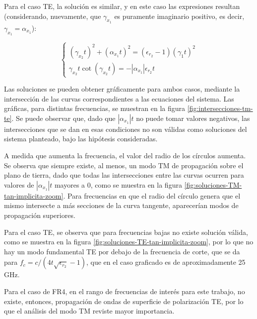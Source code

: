 Para el caso TE, la solución es similar, y en este caso las expresiones resultan (considerando, nuevamente, que $\gamma_{x_1}$ es puramente imaginario positivo, es decir, $\gamma_{x_1} = \alpha_{x_1}$):

\begin{equation}
	\label{eq:sistema-ondas-superficiales-TE}
	\begin{cases}
		(\gamma_{x_2} t)^2 + (\alpha_{x_1} t)^2 = (\epsilon_{r_2} - 1) (\gamma_1 t)^2 \\
		\gamma_{x_2} t \cot (\gamma_{x_2} t) = -|\alpha_{x_1}| \epsilon_{r_2} t
	\end{cases}
\end{equation}

Las soluciones se pueden obtener gráficamente para ambos casos, mediante la intersección de las curvas correspondientes a las ecuaciones del sistema. Las gráficas, para distintas frecuencias, se muestran en la figura \ref{fig:intersecciones-tm-te}. Se puede observar que, dado que $|\alpha_{x_1}|t$ no puede tomar valores negativos, las intersecciones que se dan en esas condiciones no son válidas como soluciones del sistema planteado, bajo las hipótesis consideradas.

A medida que aumenta la frecuencia, el valor del radio de los círculos aumenta. Se observa que siempre existe, al menos, un modo TM de propagación sobre el plano de tierra, dado que todas las intersecciones entre las curvas ocurren para valores de $|\alpha_{x_1}| t$ mayores a 0, como se muestra en la figura \ref{fig:soluciones-TM-tan-implicita-zoom}. Para frecuencias en que el radio del círculo genera que el mismo intersecte a más secciones de la curva tangente, aparecerían modos de propagación superiores.

Para el caso TE, se observa que para frecuencias bajas no existe solución válida, como se muestra en la figura \ref{fig:soluciones-TE-tan-implicita-zoom}, por lo que no hay un modo fundamental TE por debajo de la frecuencia de corte, que se da para $f_c = c/(4 t  \sqrt{\epsilon_{r_2}}-1)$, que en el caso graficado es de aproximadamente 25 GHz.

Para el caso de FR4, en el rango de frecuencias de interés para este trabajo, no existe, entonces, propagación de ondas de superficie de polarización TE, por lo que el análisis del modo TM reviste mayor importancia.


